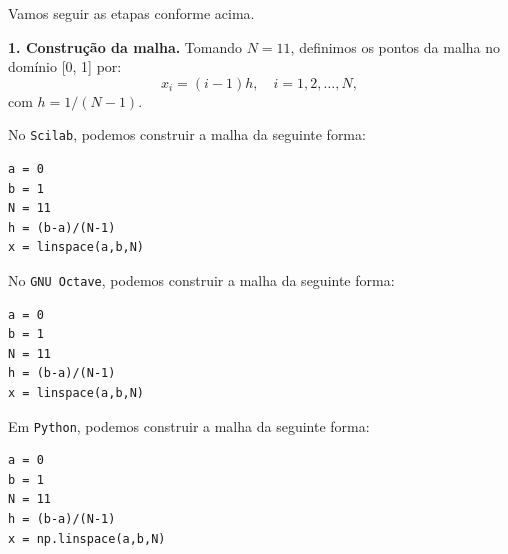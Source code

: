 \begin{sol} Vamos seguir as etapas conforme acima.

  {\bf 1. Construção da malha.} Tomando $N=11$, definimos os pontos da malha no domínio [0, 1] por:
  \begin{equation}
    x_i = (i-1)h,\quad i=1, 2, \dotsc, N,
  \end{equation}
com $h = 1/(N-1)$.

\ifisscilab
No \verb+Scilab+, podemos construir a malha da seguinte forma:
\begin{verbatim}
a = 0
b = 1
N = 11
h = (b-a)/(N-1)
x = linspace(a,b,N)
\end{verbatim}
\fi
\ifisoctave
No \verb+GNU Octave+, podemos construir a malha da seguinte forma:
\begin{verbatim}
a = 0
b = 1
N = 11
h = (b-a)/(N-1)
x = linspace(a,b,N)
\end{verbatim}
\fi
\ifispython
Em \verb+Python+, podemos construir a malha da seguinte forma:
\begin{verbatim}
a = 0
b = 1
N = 11
h = (b-a)/(N-1)
x = np.linspace(a,b,N)
\end{verbatim}
\fi


\end{sol}
